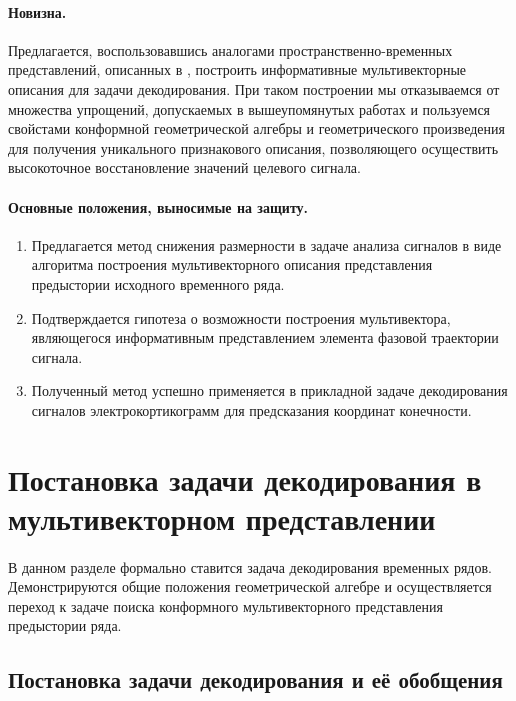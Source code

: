 \documentclass[12pt]{article}
\begin{document}
\paragraph{Новизна.} 

Предлагается, воспользовавшись аналогами пространственно-временных представлений, описанных в \cite{Thiruvengadam2020, Yuan2010}, построить информативные мультивекторные описания для задачи декодирования. При таком построении мы отказываемся от множества упрощений, допускаемых в вышеупомянутых работах и пользуемся свойстами конформной геометрической алгебры и геометрического произведения для получения уникального признакового описания, позволяющего осуществить высокоточное восстановление значений целевого сигнала.

\paragraph{Основные положения, выносимые на защиту.}
\begin{enumerate}
    \item Предлагается метод снижения размерности в задаче анализа сигналов в виде алгоритма построения мультивекторного описания представления предыстории исходного временного ряда.
    \item Подтверждается гипотеза о возможности построения мультивектора, являющегося информативным представлением элемента фазовой траектории сигнала.
    \item Полученный метод успешно применяется в прикладной задаче декодирования сигналов электрокортикограмм для предсказания координат конечности.
\end{enumerate}




\newpage
\section{Постановка задачи декодирования  в мультивекторном представлении}
\paragraph{}
В данном разделе формально ставится задача декодирования временных рядов. Демонстрируются общие положения геометрической алгебре и осуществляется переход к задаче поиска конформного мультивекторного представления предыстории ряда.

\subsection{Постановка задачи декодирования и её обобщения}
\end{document}
